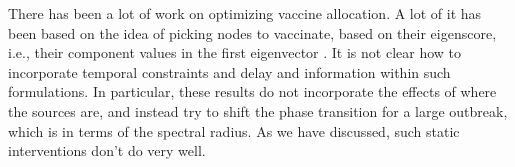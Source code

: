 There has been a lot of work on optimizing vaccine allocation. A lot of it has been based on the idea of picking nodes to vaccinate, based on their eigenscore, i.e., their component values in the first eigenvector \cite{PreciadoVM13_2,PreciadoVM13,PreciadoVM14,SahaSDM15,Ogura2017,zhang2015controlling,YaoSDM2014}. It is not clear how to incorporate temporal constraints and delay and information within such formulations. In particular, these results do not incorporate the effects of where the sources are, and instead try to shift the phase transition for a large outbreak, which is in terms of the spectral radius. As we have discussed, such static interventions don't do very well.


